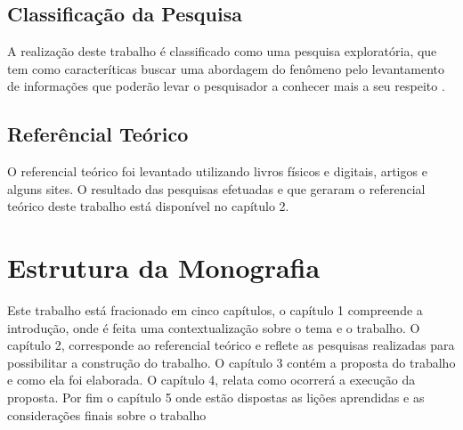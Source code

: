 \subsection{Classificação da Pesquisa}

A realização deste trabalho é classificado como uma pesquisa exploratória, que tem como caracteríticas buscar uma abordagem do fenômeno pelo levantamento de informações que poderão levar o pesquisador a conhecer mais a seu respeito \cite{gil2010metodos}. 

\subsection{Referêncial Teórico}

O referencial teórico foi levantado utilizando livros físicos e digitais, artigos e alguns sites. O resultado das pesquisas efetuadas e que geraram o referencial teórico deste trabalho está disponível no capítulo 2.

\section{Estrutura da Monografia}

Este trabalho está fracionado em cinco capítulos, o capítulo 1 compreende a introdução, onde é feita uma contextualização sobre o tema e o trabalho. O capítulo 2, corresponde ao referencial teórico e reflete as pesquisas realizadas para possibilitar a construção do trabalho.  O capítulo 3 contém a proposta do trabalho e como ela foi elaborada. O capítulo 4, relata como ocorrerá a execução da proposta. Por fim o capítulo 5 onde estão dispostas as lições aprendidas e as considerações finais sobre o trabalho
